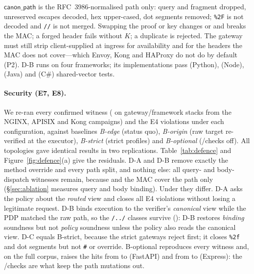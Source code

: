 $\mathsf{canon\_path}$ is the RFC~3986-normalised path only: query and fragment
dropped, unreserved escapes decoded, hex upper-cased, dot segments removed;
\texttt{\%2F} is not decoded and \texttt{//} is not merged. Swapping the proof
or key changes \jti or \jkt and breaks the MAC; a forged header fails without
$K$; a duplicate is rejected. The gateway must still strip client-supplied
 at ingress for availability and for the headers the MAC does
not cover---which Envoy, Kong and HAProxy do not do by default (P2). D-B runs
on four frameworks; its implementations pass \NumDBUnitPy{} (Python),
\NumDBUnitNode{} (Node), \NumDBUnitJava{} (Java) and \NumDBUnitCs{} (C\#)
shared-vector tests.

\paragraph{Security (E7, E8).} We re-ran every confirmed \Aleak witness
(\NumDefWitnesses{} on \NumDefStacks{} gateway/framework stacks from the NGINX,
APISIX and Kong campaigns) and the \NumDefEFourTotal{} E4 violations under each
configuration, against baselines \emph{B-edge} (status quo), \emph{B-origin}
(raw target re-verified at the executor), \emph{B-strict} (strict profiles)
and \emph{B-optional} (\htm/\htu checks off). All \NumDefRepTopos{} topologies
gave identical results in two replications. Table~\ref{tab:defence} and
Figure~\ref{fig:defence}(a) give the residuals. D-A and D-B remove exactly the
method override and every \GB path split, and nothing else: all
\NumDefResidualDA{} query- and body-dispatch witnesses remain, because \htu
and the MAC cover the path only (\S\ref{sec:ablation} measures query and body
binding). Under \Aclient they differ. D-A asks the policy about the
\emph{routed} view and closes all \NumDefEFourTotal{} E4 violations without
losing a legitimate request. D-B binds execution to the verifier's
\emph{canonical} view while the PDP matched the raw path, so the \texttt{/../}
classes survive (\NumDefEFourDB{}): D-B restores \emph{binding} soundness but
not \emph{policy} soundness unless the policy also reads the canonical view.
D-C equals B-strict, because the strict gateways reject first; it closes
\texttt{\%2f} and dot segments but not \texttt{\#} or override. B-optional
reproduces every witness and, on the full corpus, raises the hits from
\NumBEdgeFastapi{} to \NumBOptFastapi{} (FastAPI) and from \NumBEdgeExpress{}
to \NumBOptExpress{} (Express): the \htm/\htu checks are what keep the path
mutations out.

